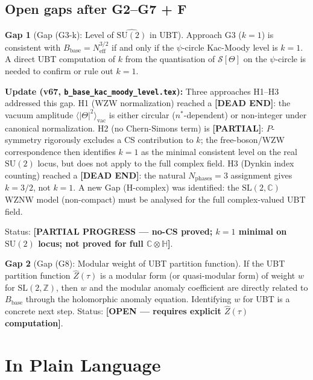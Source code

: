 \documentclass[11pt,a4paper]{article}
\theoremstyle{definition}
\newtheorem{gap}{Gap}
\theoremstyle{remark}
\begin{document}
\subsection{Open gaps after G2--G7 + F}

\begin{gap}[Gap (G3-k): Level of $\widehat{\mathrm{SU}(2)}$ in UBT]
  \label{gap:G3_k}
  Approach G3 ($k = 1$) is consistent with $B_{\mathrm{base}} =
  N_{\mathrm{eff}}^{3/2}$ if and only if the $\psi$-circle Kac-Moody
  level is $k = 1$.
  A direct UBT computation of $k$ from the quantisation of
  $\mathcal{S}[\Theta]$ on the $\psi$-circle is needed to confirm or
  rule out $k = 1$.

  \textbf{Update (v67, \texttt{b\_base\_kac\_moody\_level.tex}):}
  Three approaches H1--H3 addressed this gap.
  H1 (WZW normalization) reached a \textbf{[DEAD END]}: the vacuum
  amplitude $\langle|\Theta|^2\rangle_{\mathrm{vac}}$ is either circular
  ($n^*$-dependent) or non-integer under canonical normalization.
  H2 (no Chern-Simons term) is \textbf{[PARTIAL]}: $P$-symmetry
  rigorously excludes a CS contribution to $k$; the free-boson/WZW
  correspondence then identifies $k = 1$ as the minimal consistent level
  on the real $\mathrm{SU}(2)$ locus, but does not apply to the full
  complex field.
  H3 (Dynkin index counting) reached a \textbf{[DEAD END]}: the natural
  $N_{\mathrm{phases}} = 3$ assignment gives $k = 3/2$, not $k = 1$.
  A new Gap (H-complex) was identified: the $\mathrm{SL}(2,\mathbb{C})$
  WZNW model (non-compact) must be analysed for the full complex-valued
  UBT field.

  Status: \textbf{[PARTIAL PROGRESS — no-CS proved; $k=1$ minimal on
  $\mathrm{SU}(2)$ locus; not proved for full $\mathbb{C}\otimes\mathbb{H}$]}.
\end{gap}

\begin{gap}[Gap (G8): Modular weight of UBT partition function]
  \label{gap:G8}
  If the UBT partition function $\hat{Z}(\tau)$ is a modular form (or
  quasi-modular form) of weight $w$ for $\mathrm{SL}(2,\mathbb{Z})$, then
  $w$ and the modular anomaly coefficient are directly related to
  $B_{\mathrm{base}}$ through the holomorphic anomaly equation.
  Identifying $w$ for UBT is a concrete next step.
  Status: \textbf{[OPEN — requires explicit $\hat{Z}(\tau)$ computation]}.
\end{gap}

\section{In Plain Language}
\label{sec:plain}
\end{document}
